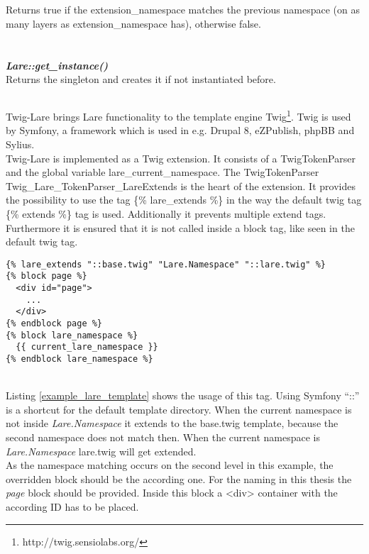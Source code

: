 \\
\\
Returns true if the extension\_namespace matches the previous namespace (on as many layers as extension\_namespace has), otherwise false.
\\
\\
\\
\large{\textbf{\textit{Lare::get\_instance()}}}
\\
Returns the \lare{} singleton and creates it if not instantiated before.

\subsection{\twigLare{}}
Twig-Lare brings Lare functionality to the template engine Twig\footnote{http://twig.sensiolabs.org/}.
Twig is used by Symfony, a framework which is used in e.g. Drupal 8, eZPublish, phpBB and Sylius.
\\
Twig-Lare is implemented as a Twig extension.
It consists of a TwigTokenParser and the global variable lare\_current\_namespace.
The TwigTokenParser
\\
Twig\_Lare\_TokenParser\_LareExtends is the heart of the extension.
It provides the possibility to use the tag \{\% lare\_extends \%\} in the way the default twig tag \{\% extends \%\} tag is used.
Additionally it prevents multiple extend tags.
Furthermore it is ensured that it is not called inside a block tag, like seen in the default twig tag.

\begin{minipage}[c]{0.95\linewidth}
\begin{lstlisting}[caption=Example Lare Template, label=example_lare_template]
{% lare_extends "::base.twig" "Lare.Namespace" "::lare.twig" %}
{% block page %}
  <div id="page">
    ...
  </div>
{% endblock page %}
{% block lare_namespace %}
  {{ current_lare_namespace }}
{% endblock lare_namespace %}
\end{lstlisting}
\end{minipage}
\\
Listing \ref{example_lare_template} shows the usage of this tag.
Using Symfony \enquote{::} is a shortcut for the default template directory.
When the current namespace is not inside \emph{Lare.Namespace} it extends to the base.twig template, because the second namespace does not match then.
When the current namespace is \emph{Lare.Namespace} lare.twig will get extended.
\\
As the namespace matching occurs on the second level in this example, the overridden block should be the according one.
For the naming in this thesis the \emph{page} block should be provided.
Inside this block a <div> container with the according ID has to be placed.

